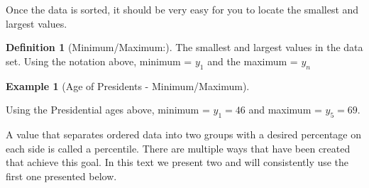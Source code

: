 \documentclass[10pt,]{book}
\theoremstyle{plain}
\theoremstyle{definition}
\newtheorem{definition}[theorem]{Definition}
\theoremstyle{definition}
\newtheorem{example}[theorem]{Example}
\theoremstyle{definition}
\numberwithin{equation}{section}
\begin{document}
	Once the data is sorted, it should be very easy for you to locate the smallest and largest values. 
\begin{definition}[{Minimum/Maximum:}]\label{definition-2}
The smallest and largest values in the data set. Using the notation above, minimum = \(y_1\) and the maximum = \(y_n\)%
\end{definition}
\begin{example}[Age of Presidents - Minimum/Maximum]\label{example-2}

	Using the Presidential ages above, minimum = \(y_1 = 46\) and maximum = \(y_5 = 69\).
\end{example}
\par

A value that separates ordered data into two groups with a desired percentage on each side is called a percentile. There are multiple ways that have been created that achieve this goal. In this text we present two and will consistently use the first one presented below.
%
\par
\end{document}
